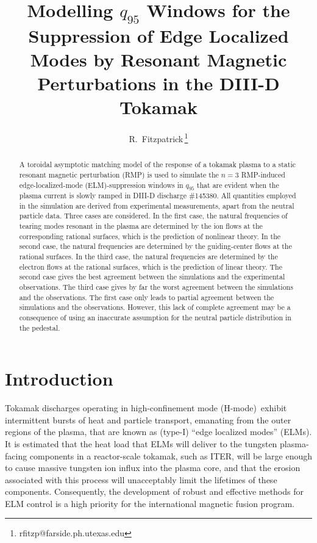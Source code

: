 \documentclass[12pt,prb,aps]{revtex4-1}
\begin{document}
\title {Modelling $q_{95}$ Windows for the Suppression of Edge Localized Modes by Resonant Magnetic Perturbations in the DIII-D Tokamak}

\author{R.~Fitzpatrick\,\footnote{rfitzp@farside.ph.utexas.edu}}

\begin{abstract}
A toroidal asymptotic matching model of the response of a tokamak plasma to a static resonant magnetic perturbation (RMP) is used to simulate the $n=3$ RMP-induced 
edge-localized-mode (ELM)-suppression
windows in $q_{95}$ that are evident when the plasma current is slowly ramped in DIII-D discharge \#145380. All quantities employed in the simulation are
derived from experimental measurements, apart from the neutral particle data. 
Three cases are considered.
In the first case, the natural frequencies of tearing modes resonant in the plasma are 
determined by the ion flows at the corresponding rational surfaces, which is the prediction of nonlinear theory.
In the second case, the natural frequencies are 
determined by the guiding-center flows at the rational surfaces.
 In the third case, the natural frequencies   are 
determined by the electron flows at the  rational surfaces, which is the prediction of linear theory.
The second case gives  the best agreement between the simulations and the  experimental observations.   The third case gives by far the worst agreement between the simulations 
and the  observations. The first case only leads to partial agreement between  the  simulations and the  observations. However, this lack of complete agreement
may be a consequence of using an inaccurate assumption for the neutral particle distribution in the pedestal.  
\end{abstract}
 
\maketitle

\section{Introduction}
Tokamak discharges operating in high-confinement mode (H-mode)\,\cite{wagner} exhibit intermittent bursts of heat and particle transport, 
emanating from the outer regions of the plasma, that are known as  (type-I) ``edge localized modes'' (ELMs).\cite{zohm}
It is estimated that the heat load that ELMs
will deliver to the tungsten plasma-facing components in a reactor-scale tokamak, such as ITER, will be large enough to cause
massive tungsten ion influx into the plasma core, and that the erosion associated with this process will 
unacceptably limit the lifetimes of these components.\cite{loarte} Consequently, the development of robust and effective
methods for ELM control is a high priority for the international magnetic fusion program. 
\end{document}

